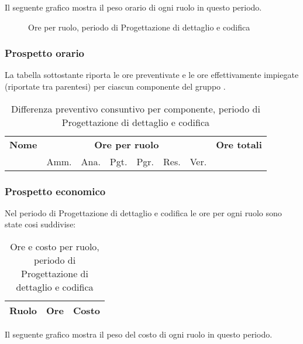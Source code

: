 	Il seguente grafico mostra il peso orario di ogni ruolo in questo periodo.

	\begin{figure}[H]
	\begin{tikzpicture}
		
	\end{tikzpicture}
	\caption{Ore per ruolo, periodo di Progettazione di dettaglio e codifica}
	\end{figure}

	\subsubsection{Prospetto orario}

	La tabella sottostante riporta le ore preventivate e le ore effettivamente impiegate (riportate tra parentesi) per ciascun componente del gruppo \GroupName{}.

	\begin{center}
	\begin{table}[H]
	\begin{tabular}{lccccccc}
	\toprule
	    \textbf{Nome}  & \multicolumn{6}{c}{\textbf{Ore per ruolo}} & \textbf{Ore totali} \\
	     & Amm. & Ana. & Pgt. & Pgr. & Res. & Ver. & \\
	    \midrule
	  	
	    \bottomrule
	\end{tabular}
	\caption{Differenza preventivo consuntivo per componente, periodo di Progettazione di dettaglio e codifica}
	\end{table}
	\end{center}


	\subsubsection{Prospetto economico}

	Nel periodo di Progettazione di dettaglio e codifica le ore per ogni ruolo sono state cosi suddivise:

	\begin{table}[H]
	\centering
	\begin{tabular}{ l c c }
		\textbf{Ruolo} & \textbf{Ore} & \textbf{Costo} \\
		\hline
		
	\end{tabular}
	\caption{Ore e costo per ruolo, periodo di Progettazione di dettaglio e codifica}
	\end{table}

	Il seguente grafico mostra il peso del costo di ogni ruolo in questo periodo.

